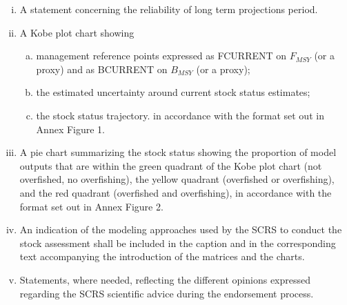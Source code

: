 \documentclass[a4paper, 11pt, oldtoc]{artikel1}
\begin{document}
\begin{enumerate}
\begin{enumerate}[i)]
      \item  A statement concerning the reliability of long term projections period.
      \item   A Kobe plot chart showing
      \begin{enumerate}[(a)]
        \item management reference points expressed as FCURRENT on $F_{MSY}$ (or a proxy) and as BCURRENT on $B_{MSY}$ (or a proxy);
        \item the estimated uncertainty around current stock status estimates;
        \item the stock status trajectory. in accordance with the format set out in Annex Figure 1.
      \end{enumerate}

      \item  A pie chart summarizing the stock status showing the proportion of model outputs that are within the green quadrant of the Kobe plot chart (not overfished, no overfishing), the yellow quadrant (overfished or overfishing), and the red quadrant (overfished and overfishing), in accordance with the format set out in Annex Figure 2.
      \item  An indication of the modeling approaches used by the SCRS to conduct the stock assessment shall be included in the caption and in the corresponding text accompanying the introduction of the matrices and the charts.
      \item  Statements, where needed, reflecting the different opinions expressed regarding the SCRS scientific advice during the endorsement process.
    \end{enumerate}


\end{enumerate}
\end{document}
